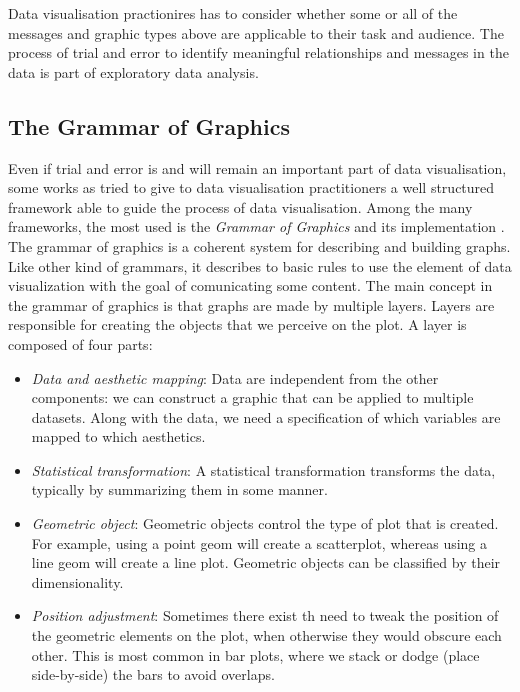 \documentclass[]{book}
\providecommand{\tightlist}{%
  \setlength{\itemsep}{0pt}\setlength{\parskip}{0pt}}
\begin{document}
Data visualisation practionires has to consider whether some or all of
the messages and graphic types above are applicable to their task and
audience. The process of trial and error to identify meaningful
relationships and messages in the data is part of exploratory data
analysis.

\subsection{The Grammar of Graphics}\label{the-grammar-of-graphics}

Even if trial and error is and will remain an important part of data
visualisation, some works as tried to give to data visualisation
practitioners a well structured framework able to guide the process of
data visualisation. Among the many frameworks, the most used is the
\emph{Grammar of Graphics} \citep{wilkinson2006grammar} and its
implementation \citep{wickham2008ggplot2}. The grammar of graphics is a
coherent system for describing and building graphs. Like other kind of
grammars, it describes to basic rules to use the element of data
visualization with the goal of comunicating some content. The main
concept in the grammar of graphics is that graphs are made by multiple
layers. Layers are responsible for creating the objects that we perceive
on the plot. A layer is composed of four parts:

\begin{itemize}
\tightlist
\item
  \emph{Data and aesthetic mapping}: Data are independent from the other
  components: we can construct a graphic that can be applied to multiple
  datasets. Along with the data, we need a specification of which
  variables are mapped to which aesthetics.
\item
  \emph{Statistical transformation}: A statistical transformation
  transforms the data, typically by summarizing them in some manner.
\item
  \emph{Geometric object}: Geometric objects control the type of plot
  that is created. For example, using a point geom will create a
  scatterplot, whereas using a line geom will create a line plot.
  Geometric objects can be classified by their dimensionality.
\item
  \emph{Position adjustment}: Sometimes there exist th need to tweak the
  position of the geometric elements on the plot, when otherwise they
  would obscure each other. This is most common in bar plots, where we
  stack or dodge (place side-by-side) the bars to avoid overlaps.
\end{itemize}
\end{document}
